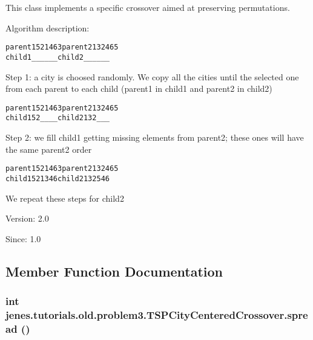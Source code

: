 This class implements a specific crossover aimed at preserving permutations.

Algorithm description: \small\begin{alltt}
      parent1  5 2 1 4 6 3     parent2   1 3 2 4 6 5
      child1   \_ \_ \_ \_ \_ \_     child2    \_ \_ \_ \_ \_ \_
\end{alltt}
\normalsize 
 Step 1: a city is choosed randomly. We copy all the cities until the selected one from each parent to each child (parent1 in child1 and parent2 in child2) \small\begin{alltt}
      parent1  5 2 1 4 6 3     parent2   1 3 2 4 6 5
      child1   5 2 \_ \_ \_ \_     child2    1 3 2 \_ \_ \_
 \end{alltt}
\normalsize 
 Step 2: we fill child1 getting missing elements from parent2; these ones will have the same parent2 order \small\begin{alltt}
      parent1  5 2 1 4 6 3     parent2  1 3 2 4 6 5
      child1   5 2 1 3 4 6     child2   1 3 2 5 4 6
\end{alltt}
\normalsize 


We repeat these steps for child2

\begin{Desc}
\item[Version:]2.0 \end{Desc}
\begin{Desc}
\item[Since:]1.0 \end{Desc}


\subsection{Member Function Documentation}
\hypertarget{classjenes_1_1tutorials_1_1old_1_1problem3_1_1_t_s_p_city_centered_crossover_8e53f91513fd450e8852d22fb5afaf17}{
\subsubsection[spread]{\setlength{\rightskip}{0pt plus 5cm}int jenes.tutorials.old.problem3.TSPCityCenteredCrossover.spread ()}}
\label{classjenes_1_1tutorials_1_1old_1_1problem3_1_1_t_s_p_city_centered_crossover_8e53f91513fd450e8852d22fb5afaf17}


